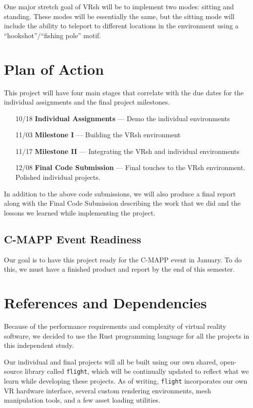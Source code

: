 \documentclass[titlepage,12pt]{article}
\begin{document}
One major stretch goal of VRsh will be to implement two modes: sitting and
standing. These modes will be essentially the same, but the sitting mode will
include the ability to teleport to different locations in the environment using
a ``hookshot''/``fishing pole'' motif.

\section{Plan of Action}

This project will have four main stages that correlate with the due dates for
the individual assignments and the final project milestones.

\begin{enumerate}[leftmargin=*]
    \item [10/18] \textbf{Individual Assignments} --- Demo the individual
        environments
    \item [11/03] \textbf{Milestone I} --- Building the VRsh environment
    \item [11/17] \textbf{Milestone II} --- Integrating the VRsh and individual
        environments
    \item [12/08] \textbf{Final Code Submission} --- Final touches to the VRsh
        environment. Polished individual projects.
\end{enumerate}

In addition to the above code submissions, we will also produce a final report
along with the Final Code Submission describing the work that we did and the
lessons we learned while implementing the project.

\subsection{C-MAPP Event Readiness}
Our goal is to have this project ready for the C-MAPP event in January. To do
this, we must have a finished product and report by the end of this semester.

\section{References and Dependencies}

Because of the performance requirements and complexity of virtual reality
software, we decided to use the Rust programming language for all the projects
in this independent study.

Our individual and final projects will all be built using our own shared,
open-source library called \texttt{flight}, which will be continually updated to
reflect what we learn while developing these projects. As of writing,
\texttt{flight} incorporates our own VR hardware interface, several custom
rendering environments, mesh manipulation tools, and a few asset loading
utilities.
\end{document}
